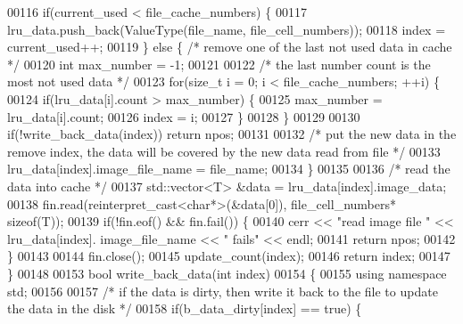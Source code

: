 \begin{DoxyCode}
00116                 \textcolor{keywordflow}{if}(current\_used < file\_cache\_numbers) \{
00117                         lru\_data.push\_back(ValueType(file\_name, 
      file\_cell\_numbers));
00118                         index = current\_used++;
00119                 \} \textcolor{keywordflow}{else} \{                \textcolor{comment}{/* remove one of the last not used data
       in cache */}
00120                         \textcolor{keywordtype}{int} max\_number = -1;
00121 
00122                         \textcolor{comment}{/* the last number count is the most not used data */}
00123                         \textcolor{keywordflow}{for}(\textcolor{keywordtype}{size\_t} i = 0; i < file\_cache\_numbers; ++i) \{
00124                                 \textcolor{keywordflow}{if}(lru\_data[i].count > max\_number)      \{
00125                                         max\_number = lru\_data[i].count;
00126                                         index = i;
00127                                 \}
00128                         \}
00129 
00130                         \textcolor{keywordflow}{if}(!write_back_data(index)) \textcolor{keywordflow}{return} npos;
00131 
00132                         \textcolor{comment}{/* put the new data in the remove index, the data will
       be covered by the new data read from file */}
00133                         lru\_data[index].image\_file\_name = file\_name;
00134                 \}
00135 
00136                 \textcolor{comment}{/* read the data into cache */}
00137                 std::vector<T> &data = lru\_data[index].image\_data;
00138                 fin.read(reinterpret\_cast<char*>(&data[0]), file\_cell\_numbers*\textcolor{keyword}{
      sizeof}(T));
00139                 \textcolor{keywordflow}{if}(!fin.eof() && fin.fail()) \{
00140                         cerr << \textcolor{stringliteral}{"read image file "} << lru\_data[index].
      image\_file\_name << \textcolor{stringliteral}{" fails"} << endl;
00141                         \textcolor{keywordflow}{return} npos;
00142                 \}
00143 
00144                 fin.close();
00145                 update_count(index);
00146                 \textcolor{keywordflow}{return} index;
00147         \}
00148 
00153         \textcolor{keywordtype}{bool} write_back_data(\textcolor{keywordtype}{int} index) 
00154         \{
00155                 \textcolor{keyword}{using namespace }std;
00156 
00157                 \textcolor{comment}{/* if the data is dirty, then write it back to the file to
       update the data in the disk */}
00158                 \textcolor{keywordflow}{if}(b\_data\_dirty[index] == \textcolor{keyword}{true}) \{

\end{DoxyCode}
